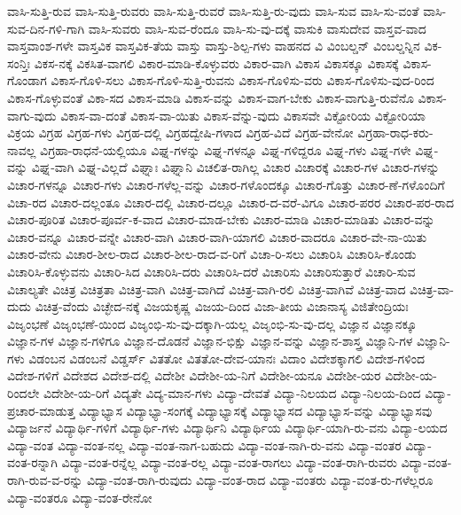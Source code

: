 {ವಾಸಿ-ಸುತ್ತಿ-ರುವ
ವಾಸಿ-ಸುತ್ತಿ-ರುವರು
ವಾಸಿ-ಸುತ್ತಿ-ರುವರೆ
ವಾಸಿ-ಸುತ್ತಿ-ರು-ವುದು
ವಾಸಿ-ಸುವ
ವಾಸಿ-ಸು-ವಂತೆ
ವಾಸಿ-ಸುವ-ದಿನ-ಗಳಿ-ಗಾಗಿ
ವಾಸಿ-ಸುವರು
ವಾಸಿ-ಸುವ-ರೆಂದೂ
ವಾಸಿ-ಸು-ವು-ದಕ್ಕೆ
ವಾಸುಕಿ
ವಾಸುದೇವ
ವಾಸ್ತವ-ವಾದ
ವಾಸ್ತವಾಂಶ-ಗಳೇ
ವಾಸ್ತವಿಕ
ವಾಸ್ತವಿಕ-ತೆಯ
ವಾಸ್ತು
ವಾಸ್ತು-ಶಿಲ್ಪ-ಗಳು
ವಾಹನದ
ವಿ
ವಿಂಬಲ್ಡನ್
ವಿಂಬಲ್ಡನ್ನಿನ
ವಿಕ-ಸಂನ್ತಿಃ
ವಿಕಸ-ನಕ್ಕೆ
ವಿಕಸಿತ-ವಾಗಲಿ
ವಿಕಾರ-ಮಾಡಿ-ಕೊಳ್ಳುವರು
ವಿಕಾರ-ವಾಗಿ
ವಿಕಾಸ
ವಿಕಾಸಕ್ಕೂ
ವಿಕಾಸಕ್ಕೆ
ವಿಕಾಸ-ಗೊಂಡಾಗ
ವಿಕಾಸ-ಗೊಳಿ-ಸಲು
ವಿಕಾಸ-ಗೊಳಿ-ಸುತ್ತಿ-ರುವನು
ವಿಕಾಸ-ಗೊಳಿಸು-ವರು
ವಿಕಾಸ-ಗೊಳಿಸು-ವುದ-ರಿಂದ
ವಿಕಾಸ-ಗೊಳ್ಳುವಂತೆ
ವಿಕಾ-ಸದ
ವಿಕಾಸ-ಮಾಡಿ
ವಿಕಾಸ-ವನ್ನು
ವಿಕಾಸ-ವಾಗ-ಬೇಕು
ವಿಕಾಸ-ವಾಗುತ್ತಿ-ರುವೆನೊ
ವಿಕಾಸ-ವಾಗು-ವುದು
ವಿಕಾಸ-ವಾ-ದಂತೆ
ವಿಕಾಸ-ವಾ-ಯಿತು
ವಿಕಾಸ-ವೆನ್ನು-ವುದು
ವಿಕಾಸವೇ
ವಿಕ್ಟೋರಿಯ
ವಿಕ್ಟೋರಿಯಾ
ವಿಕ್ರಯ
ವಿಗ್ರಹ
ವಿಗ್ರಹ-ಗಳು
ವಿಗ್ರಹ-ದಲ್ಲಿ
ವಿಗ್ರಹದ್ವೇಷಿ-ಗಳಾದ
ವಿಗ್ರಹ-ವಿದೆ
ವಿಗ್ರಹ-ವೇನೋ
ವಿಗ್ರಹಾ-ರಾಧ-ಕರು-ನಾವಲ್ಲ
ವಿಗ್ರಹಾ-ರಾಧನೆ-ಯಲ್ಲಿಯೂ
ವಿಘ್ನ-ಗಳನ್ನು
ವಿಘ್ನ-ಗಳನ್ನೂ
ವಿಘ್ನ-ಗಳಿದ್ದರೂ
ವಿಘ್ನ-ಗಳು
ವಿಘ್ನ-ಗಳೇ
ವಿಘ್ನ-ವನ್ನು
ವಿಘ್ನ-ವಾಗಿ
ವಿಘ್ನ-ವಿಲ್ಲದೆ
ವಿಘ್ನಾಃ
ವಿಘ್ನಾನಿ
ವಿಚಲಿತ-ರಾಗಿಲ್ಲ
ವಿಚಾರ
ವಿಚಾರಕ್ಕೆ
ವಿಚಾರ-ಗಳ
ವಿಚಾರ-ಗಳನ್ನು
ವಿಚಾರ-ಗಳನ್ನೂ
ವಿಚಾರ-ಗಳು
ವಿಚಾರ-ಗಳೆಲ್ಲ-ವನ್ನು
ವಿಚಾರ-ಗಳೊಂದಕ್ಕೂ
ವಿಚಾರ-ಗೊತ್ತು
ವಿಚಾರ-ಣೆ-ಗಳೊಂದಿಗೆ
ವಿಚಾ-ರದ
ವಿಚಾರ-ದಲ್ಲಂತೂ
ವಿಚಾರ-ದಲ್ಲಿ
ವಿಚಾರ-ದಲ್ಲೂ
ವಿಚಾರ-ದ-ವರೆ-ವಿಗೂ
ವಿಚಾರ-ಪರರ
ವಿಚಾರ-ಪರ-ರಾದ
ವಿಚಾರ-ಪೂರಿತ
ವಿಚಾರ-ಪೂರ್ವ-ಕ-ವಾದ
ವಿಚಾರ-ಮಾಡ-ಬೇಕು
ವಿಚಾರ-ಮಾಡಿ
ವಿಚಾರ-ಮಾಡಿತು
ವಿಚಾರ-ವನ್ನು
ವಿಚಾರ-ವನ್ನೂ
ವಿಚಾರ-ವನ್ನೇ
ವಿಚಾರ-ವಾಗಿ
ವಿಚಾರ-ವಾಗಿ-ಯಾಗಲಿ
ವಿಚಾರ-ವಾದರೂ
ವಿಚಾರ-ವೇ-ನಾ-ಯಿತು
ವಿಚಾರ-ವೇನು
ವಿಚಾರ-ಶೀಲ-ರಾದ
ವಿಚಾರ-ಶೀಲ-ರಾದ-ವ-ರಿಗೆ
ವಿಚಾ-ರಿ-ಸಲು
ವಿಚಾರಿಸಿ
ವಿಚಾರಿಸಿ-ಕೊಂಡು
ವಿಚಾರಿಸಿ-ಕೊಳ್ಳುವನು
ವಿಚಾರಿ-ಸಿದ
ವಿಚಾರಿಸಿ-ದರು
ವಿಚಾರಿಸಿ-ದರೆ
ವಿಚಾರಿಸು
ವಿಚಾರಿಸುತ್ತಾರೆ
ವಿಚಾರಿ-ಸುವ
ವಿಚಾಲ್ಯತೇ
ವಿಚಿತ್ರ
ವಿಚಿತ್ರತಾ
ವಿಚಿತ್ರ-ವಾಗಿ
ವಿಚಿತ್ರ-ವಾಗಿದೆ
ವಿಚಿತ್ರ-ವಾಗಿ-ರಲಿ
ವಿಚಿತ್ರ-ವಾಗಿವೆ
ವಿಚಿತ್ರ-ವಾದ
ವಿಚಿತ್ರ-ವಾ-ದುದು
ವಿಚಿತ್ರ-ವೆಂದು
ವಿಚ್ಛೇದ-ನಕ್ಕೆ
ವಿಜಯಕೃಷ್ಣ
ವಿಜಯ-ದಿಂದ
ವಿಜಾ-ತೀಯ
ವಿಜಾನಾಸ್ಯ
ವಿಜಿತೇಂದ್ರಿಯಃ
ವಿಜೃಂಭಣೆ
ವಿಜೃಂಭಣೆ-ಯಿಂದ
ವಿಜೃಂಭಿ-ಸು-ವು-ದಕ್ಕಾಗಿ-ಯಲ್ಲ
ವಿಜೃಂಭಿ-ಸು-ವು-ದಲ್ಲ
ವಿಜ್ಞಾನ
ವಿಜ್ಞಾನಕ್ಕೂ
ವಿಜ್ಞಾನ-ಗಳ
ವಿಜ್ಞಾನ-ಗಳಿಗೂ
ವಿಜ್ಞಾನ-ದೊಡನೆ
ವಿಜ್ಞಾನ-ಭಿಕ್ಷು
ವಿಜ್ಞಾನ-ವನ್ನು
ವಿಜ್ಞಾನ-ಶಾಸ್ತ್ರ
ವಿಜ್ಞಾನಿ-ಗಳ
ವಿಜ್ಞಾನಿ-ಗಳು
ವಿಡಂಬನ
ವಿಡಂಬನೆ
ವಿಡ್ಡರ್ಸ್
ವಿತತೋ
ವಿತತೋ-ದೇವ-ಯಾನಃ
ವಿದಾಂ
ವಿದೇಶಕ್ಕಾಗಲಿ
ವಿದೇಶ-ಗಳಿಂದ
ವಿದೇಶ-ಗಳಿಗೆ
ವಿದೇಶದ
ವಿದೇಶ-ದಲ್ಲಿ
ವಿದೇಶೀ
ವಿದೇಶೀ-ಯ-ನಿಗೆ
ವಿದೇಶೀ-ಯನೂ
ವಿದೇಶೀ-ಯರ
ವಿದೇಶೀ-ಯ-ರಿಂದಲೇ
ವಿದೇಶೀ-ಯ-ರಿಗೆ
ವಿದ್ಯತೇ
ವಿದ್ಯ-ಮಾನ-ಗಳು
ವಿದ್ಯಾ-ದೇವತೆ
ವಿದ್ಯಾ-ನಿಲಯದ
ವಿದ್ಯಾ-ನಿಲಯ-ದಿಂದ
ವಿದ್ಯಾ-ಪ್ರಚಾರ-ಮಾಡುತ್ತ
ವಿದ್ಯಾಭ್ಯಾಸ
ವಿದ್ಯಾಭ್ಯಾ-ಸಂಗಕ್ಕೆ
ವಿದ್ಯಾಭ್ಯಾಸಕ್ಕೆ
ವಿದ್ಯಾಭ್ಯಾಸದ
ವಿದ್ಯಾಭ್ಯಾಸ-ವನ್ನು
ವಿದ್ಯಾಭ್ಯಾಸವು
ವಿದ್ಯಾರ್ಜನೆ
ವಿದ್ಯಾರ್ಥಿ-ಗಳಿಗೆ
ವಿದ್ಯಾರ್ಥಿ-ಗಳು
ವಿದ್ಯಾರ್ಥಿನಿ
ವಿದ್ಯಾರ್ಥಿಯ
ವಿದ್ಯಾರ್ಥಿ-ಯಾಗಿ-ರು-ವನು
ವಿದ್ಯಾ-ಲಯದ
ವಿದ್ಯಾ-ವಂತ
ವಿದ್ಯಾ-ವಂತ-ನಲ್ಲ
ವಿದ್ಯಾ-ವಂತ-ನಾಗ-ಬಹುದು
ವಿದ್ಯಾ-ವಂತ-ನಾಗಿ-ರು-ವನು
ವಿದ್ಯಾ-ವಂತರ
ವಿದ್ಯಾ-ವಂತ-ರನ್ನಾಗಿ
ವಿದ್ಯಾ-ವಂತ-ರನ್ನೆಲ್ಲ
ವಿದ್ಯಾ-ವಂತ-ರಲ್ಲ
ವಿದ್ಯಾ-ವಂತ-ರಾಗಲು
ವಿದ್ಯಾ-ವಂತ-ರಾಗಿ-ರುವರು
ವಿದ್ಯಾ-ವಂತ-ರಾಗಿ-ರುವ-ವ-ರನ್ನು
ವಿದ್ಯಾ-ವಂತ-ರಾಗಿ-ರುವುದು
ವಿದ್ಯಾ-ವಂತ-ರಾದ
ವಿದ್ಯಾ-ವಂತರು
ವಿದ್ಯಾ-ವಂತ-ರು-ಗಳೆಲ್ಲರೂ
ವಿದ್ಯಾ-ವಂತರೂ
ವಿದ್ಯಾ-ವಂತ-ರೇನೋ
}
